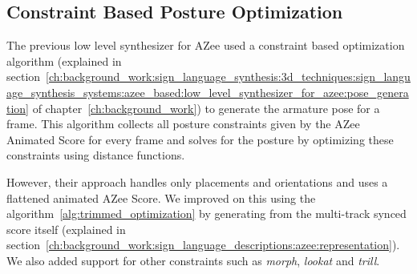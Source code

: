 \documentclass[../../main.tex]{subfiles}
\begin{document}
\subsection{Constraint Based Posture Optimization}
\label{ch:avatar_creation_pose_synthesis:proc_rig_signing_avatars:cb_posegen}

The previous low level synthesizer for AZee used a constraint based optimization algorithm (explained in section~\ref{ch:background_work:sign_language_synthesis:3d_techniques:sign_language_synthesis_systems:azee_based:low_level_synthesizer_for_azee:pose_generation} of chapter~\ref{ch:background_work}) to generate the armature pose for a frame. This algorithm collects all posture constraints given by the AZee Animated Score for every frame and solves for the posture by optimizing these constraints using distance functions. 

However, their approach handles only placements and orientations and uses a flattened animated AZee Score. We improved on this using the algorithm~\ref{alg:trimmed_optimization} by generating from the multi-track synced score itself (explained in section~\ref{ch:background_work:sign_language_descriptions:azee:representation}). We also added support for other constraints such as \emph{morph}, \emph{lookat} and \emph{trill}.
\end{document}

